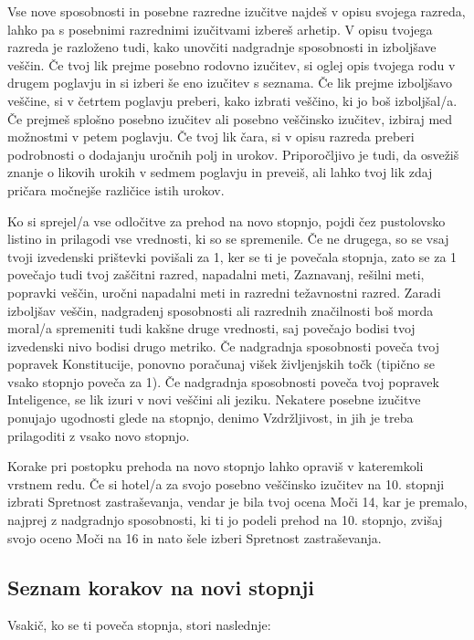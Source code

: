 Vse nove sposobnosti in posebne razredne izučitve najdeš v opisu svojega razreda, lahko pa s posebnimi razrednimi izučitvami izbereš arhetip. V opisu tvojega razreda je razloženo tudi, kako unovčiti nadgradnje sposobnosti in izboljšave veščin. Če tvoj lik prejme posebno rodovno izučitev, si oglej opis tvojega rodu v drugem poglavju in si izberi še eno izučitev s seznama. Če lik prejme izboljšavo veščine, si v četrtem poglavju preberi, kako izbrati veščino, ki jo boš izboljšal/a. Če prejmeš splošno posebno izučitev ali posebno veščinsko izučitev, izbiraj med možnostmi v petem poglavju. Če tvoj lik čara, si v opisu razreda preberi podrobnosti o dodajanju uročnih polj in urokov. Priporočljivo je tudi, da osvežiš znanje o likovih urokih v sedmem poglavju in preveiš, ali lahko tvoj lik zdaj pričara močnejše različice istih urokov.

Ko si sprejel/a vse odločitve za prehod na novo stopnjo, pojdi čez pustolovsko listino in prilagodi vse vrednosti, ki so se spremenile. Če ne drugega, so se vsaj tvoji izvedenski prištevki povišali za 1, ker se ti je povečala stopnja, zato se za 1 povečajo tudi tvoj zaščitni razred, napadalni meti, Zaznavanj, rešilni meti, popravki veščin, uročni napadalni meti in razredni težavnostni razred. Zaradi izboljšav veščin, nadgradenj sposobnosti ali razrednih značilnosti boš morda moral/a spremeniti tudi kakšne druge vrednosti, saj povečajo bodisi tvoj izvedenski nivo bodisi drugo metriko. Če nadgradnja sposobnosti poveča tvoj popravek Konstitucije, ponovno poračunaj višek življenjskih točk (tipično se vsako stopnjo poveča za 1). Če nadgradnja sposobnosti poveča tvoj popravek Inteligence, se lik izuri v novi veščini ali jeziku. Nekatere posebne izučitve ponujajo ugodnosti glede na stopnjo, denimo Vzdržljivost, in jih je treba prilagoditi z vsako novo stopnjo.

Korake pri postopku prehoda na novo stopnjo lahko opraviš v kateremkoli vrstnem redu. Če si hotel/a za svojo posebno veščinsko izučitev na 10. stopnji izbrati Spretnost zastraševanja, vendar je bila tvoj ocena Moči 14, kar je premalo, najprej z nadgradnjo sposobnosti, ki ti jo podeli prehod na 10. stopnjo, zvišaj svojo oceno Moči na 16 in nato šele izberi Spretnost zastraševanja.

\subsection{Seznam korakov na novi stopnji}
Vsakič, ko se ti poveča stopnja, stori naslednje:


